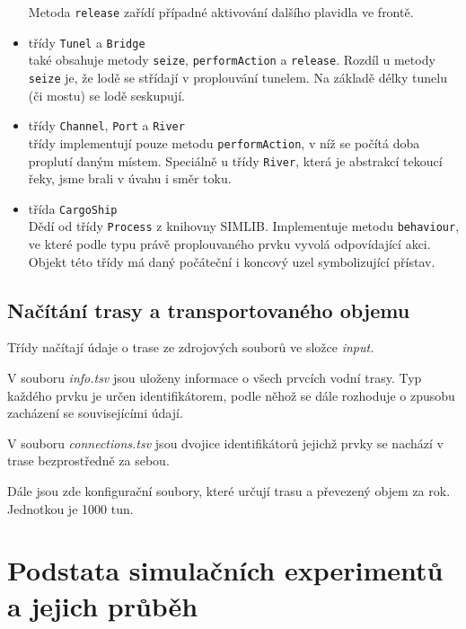 \documentclass[11pt,a4paper]{article}
\begin{document}
\begin{itemize}
              Metoda \texttt{release} zařídí případné aktivování dalšího
              plavidla ve frontě.
        \item třídy \texttt{Tunel} a \texttt{Bridge} \\
              také obsahuje metody \texttt{seize}, \texttt{performAction} a
              \texttt{release}. Rozdíl u metody \texttt{seize} je, že lodě se
              střídají v proplouvání tunelem. Na základě délky tunelu
              (či mostu) se lodě seskupují.
        \item třídy \texttt{Channel}, \texttt{Port} a \texttt{River} \\
              třídy implementují pouze metodu \texttt{performAction}, v níž se
              počítá doba proplutí daným místem. Speciálně u třídy
              \texttt{River}, která je abstrakcí tekoucí řeky, jsme brali v
              úvahu i směr toku.
        \item třída \texttt{CargoShip} \\
              Dědí od třídy \texttt{Process} z knihovny SIMLIB. Implementuje
              metodu \texttt{behaviour}, ve které podle typu právě
              proplouvaného prvku vyvolá odpovídající akci. Objekt této třídy
              má daný počáteční i
              koncový uzel symbolizující přístav.
      \end{itemize}

    \subsection{Načítání trasy a transportovaného objemu}

      Třídy načítají údaje o trase ze zdrojových souborů ve složce
      \textit{input.}

      V souboru \textit{info.tsv} jsou uloženy informace o všech 
      prvcích vodní trasy. Typ každého prvku je určen identifikátorem, podle
      něhož se dále rozhoduje o zpusobu zacházení se souvisejícími údají.

      V souboru \textit{connections.tsv} jsou dvojice identifikátorů jejichž
      prvky se nachází v trase bezprostředně za sebou.

      Dále jsou zde konfigurační soubory, které určují trasu a převezený objem
      za rok. Jednotkou je 1000 tun.

  \section{Podstata simulačních experimentů a jejich průběh}
\end{document}
